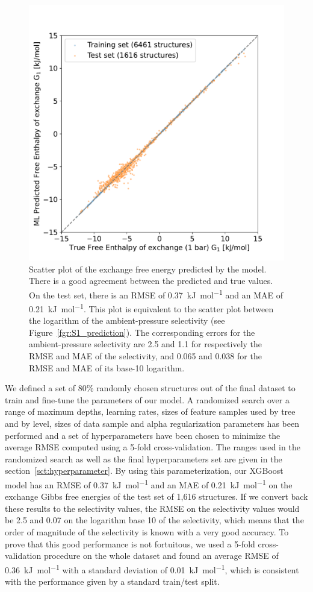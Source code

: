 \documentclass[main]{subfiles}
\begin{document}
\begin{figure}[ht]
\centering
  \includegraphics[width=0.5\linewidth]{figures/4-ml/main/Scatterplot_G1_prediction.pdf}
  \caption{Scatter plot of the exchange free energy predicted by the model. There is a good agreement between the predicted and true values. On the test set, there is an RMSE of \SI{0.37}{\kilo\joule\per\mole} and an MAE of \SI{0.21}{\kilo\joule\per\mole}. This plot is equivalent to the scatter plot between the logarithm of the ambient-pressure selectivity (see Figure~\ref{fgr:S1_prediction}). The corresponding errors for the ambient-pressure selectivity are 2.5 and 1.1 for respectively the RMSE and MAE of the selectivity, and 0.065 and 0.038 for the RMSE and MAE of its base-10 logarithm. }\label{fgr:G1_prediction}
\end{figure}

We defined a set of {80\%} randomly chosen structures out of the final dataset to train and fine-tune the parameters of our model. A randomized search over a range of maximum depths, learning rates, sizes of feature samples used by tree and by level, sizes of data sample and alpha regularization parameters has been performed and a set of hyperparameters have been chosen to minimize the average RMSE computed using a 5-fold cross-validation. The ranges used in the randomized search as well as the final hyperparameters set are given in the section~\ref{sct:hyperparameter}. By using this parameterization, our XGBoost model has an RMSE of \SI{0.37}{\kilo\joule\per\mole} and an MAE of \SI{0.21}{\kilo\joule\per\mole} on the exchange Gibbs free energies of the test set of 1,616 structures. If we convert back these results to the selectivity values, the RMSE on the selectivity values would be 2.5 and 0.07 on the logarithm base 10 of the selectivity, which means that the order of magnitude of the selectivity is known with a very good accuracy. To prove that this good performance is not fortuitous, we used a 5-fold cross-validation procedure on the whole dataset and found an average RMSE of \SI{0.36}{\kilo\joule\per\mole} with a standard deviation of \SI{0.01}{\kilo\joule\per\mole}, which is consistent with the performance given by a standard train/test split.
\end{document}

